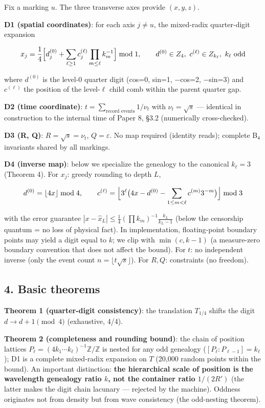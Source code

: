 \documentclass[
]{ltjsarticle}
\begin{document}
Fix a marking \(u\). The three transverse axes provide \((x,y,z)\).

\textbf{D1 (spatial coordinates)}: for each axis \(j\neq u\), the
mixed-radix quarter-digit expansion

\[
x_j=\frac{1}{4}\Bigl[d_j^{(0)}+\sum_{\ell\ge1}c_j^{(\ell)}\prod_{m\le\ell}k_m^{-1}\Bigr]\bmod 1,
\qquad d^{(0)}\in Z_4,\ c^{(\ell)}\in Z_{k_\ell},\ k_\ell\ \text{odd}
\]

where \(d^{(0)}\) is the level-0 quarter digit (cos=0, sin=1, −cos=2,
−sin=3) and \(c^{(\ell)}\) the position of the level-\(\ell\) child comb
within the parent quarter gap.

\textbf{D2 (time coordinate)}: \(t=\sum_{\text{record events}}1/\nu_t\)
with \(\nu_t=\sqrt{s}\) --- identical in construction to the internal
time of Paper 8, §3.2 (numerically cross-checked).

\textbf{D3 (R, Q)}: \(R=\sqrt{s}=\nu_t\), \(Q=\varepsilon\). No map
required (identity reads); complete B₄ invariants shared by all
markings.

\textbf{D4 (inverse map)}: below we specialize the genealogy to the
canonical \(k_\ell=3\) (Theorem 4). For \(x_j\): greedy rounding to
depth \(L\),

\[
d^{(0)}=\lfloor4x\rfloor\bmod4,\qquad
c^{(\ell)}=\Bigl\lfloor 3^{\ell}\bigl(4x-d^{(0)}-\sum_{1\le m<\ell}c^{(m)}3^{-m}\bigr)\Bigr\rfloor\bmod 3
\]

with the error guarantee
\(|x-\hat x_L|\le\frac14(\prod k_m)^{-1}\frac{k_L}{k_L-1}\) (below the
censorship quantum = no loss of physical fact). In implementation,
floating-point boundary points may yield a digit equal to \(k\); we clip
with \(\min(c,k{-}1)\) (a measure-zero boundary convention that does not
affect the bound). For \(t\): no independent inverse (only the event
count \(n=\lfloor t\sqrt s\rfloor\)). For \(R,Q\): constraints (no
freedom).

\subsection{4. Basic theorems}\label{basic-theorems}

\textbf{Theorem 1 (quarter-digit consistency)}: the translation
\(T_{1/4}\) shifts the digit \(d\to d+1\pmod4\) (exhaustive, 4/4).

\textbf{Theorem 2 (completeness and rounding bound)}: the chain of
position lattices
\(P_\ell=(4k_1\cdots k_\ell)^{-1}\mathbb{Z}/\mathbb{Z}\) is nested for
any odd genealogy (\([P_\ell:P_{\ell-1}]=k_\ell\)); D1 is a complete
mixed-radix expansion on \(T\) (20,000 random points within the bound).
An important distinction: \textbf{the hierarchical scale of position is
the wavelength genealogy ratio \(k\), not the container ratio
\(1/(2R')\)} (the latter makes the digit chain lacunary --- rejected by
the machine). Oddness originates not from density but from wave
consistency (the odd-nesting theorem).
\end{document}
